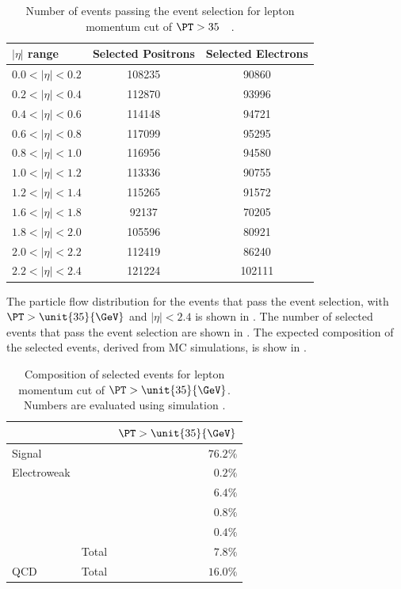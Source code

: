 \begin{table}[htbp]
 \begin{center}
 \begin{tabular}{lcc}
\toprule
 $|\eta|$ range & Selected Positrons & Selected Electrons\\
 \midrule
 $0.0<| \eta |<0.2$ & 108235 &  90860 \\
 $0.2<| \eta |<0.4$ & 112870 &  93996 \\
 $0.4<| \eta |<0.6$ & 114148 &  94721 \\
 $0.6<| \eta |<0.8$ & 117099 &  95295 \\
 $0.8<| \eta |<1.0$ & 116956 &  94580 \\
 $1.0<| \eta |<1.2$ & 113336 &  90755 \\
 $1.2<| \eta |<1.4$ & 115265 &  91572 \\
 $1.6<| \eta |<1.8$ &  92137 &  70205 \\
 $1.8<| \eta |<2.0$ & 105596 &  80921 \\
 $2.0<| \eta |<2.2$ & 112419 &  86240 \\
 $2.2<| \eta |<2.4$ & 121224 & 102111 \\
\bottomrule
 \end{tabular}
 \caption{Number of events passing the event selection for lepton momentum cut
 of \unit{$\PT>35$}{\GeV} \cite{bendavid2011electron}.  }
\label{tab:updatedselectedevents}
\end{center}
\end{table}

The particle flow \ETm distribution for the events that pass the event
selection, with $\PT > \unit{35}{\GeV}$ and $|\eta| < 2.4$ is shown in
.
The number of selected events that pass the event selection are shown in
. 
The expected composition of the selected events, derived from MC simulations, is
show in . 

\begin{table}[htbp]
\begin{center}
\begin{tabular}{llr}
    \toprule
& & $\PT>\unit{35}{\GeV}$\\ \midrule
\midrule
Signal & \HepProcess{\PW\to\Pe\Pnu} & $76.2\%$ \\
Electroweak & \HepProcess{\PZ\to\Ptau\Ptau} & $0.2\%$  \\
    & \HepProcess{\PZ\to\Pe\Pe}     & $6.4\%$  \\
    & \HepProcess{\PW\to\Ptau\Pnu}  & $0.8\%$  \\
    & \HepProcess{\Ptop\APtop}      & $0.4\%$  \\
    & Total                         & $7.8\%$  \\
QCD & Total                         & $16.0\%$ \\
\bottomrule
\end{tabular}
\caption{Composition of selected events for lepton momentum cut of
$\PT>\unit{35}{\GeV}$. Numbers are evaluated using simulation \cite{bendavid2011electron}.}
\label{tab:updatedselectedcomp}
\end{center}
\end{table}


